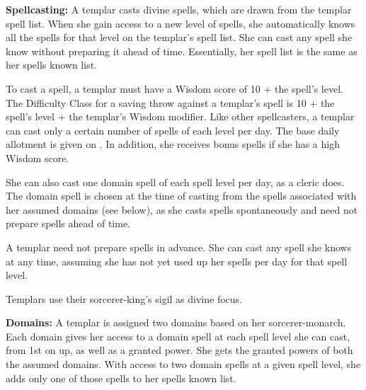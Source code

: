 \textbf{Spellcasting:} A templar casts divine spells, which are drawn from the templar spell list. When she gain access to a new level of spells, she automatically knows all the spells for that level on the templar's spell list. She can cast any spell she know without preparing it ahead of time. Essentially, her spell list is the same as her spells known list.

To cast a spell, a templar must have a Wisdom score of 10 + the spell's level. The Difficulty Class for a saving throw against a templar's spell is 10 + the spell's level + the templar's Wisdom modifier. Like other spellcasters, a templar can cast only a certain number of spells of each level per day. The base daily allotment is given on . In addition, she receives bonus spells if she has a high Wisdom score.

She can also cast one domain spell of each spell level per day, as a cleric does. The domain spell is chosen at the time of casting from the spells associated with her assumed domains (see below), as she casts spells spontaneously and need not prepare spells ahead of time.

A templar need not prepare spells in advance. She can cast any spell she knows at any time, assuming she has not yet used up her spells per day for that spell level.

Templars use their sorcerer-king's sigil as divine focus.


\textbf{Domains:} A templar is assigned two domains based on her sorcerer-monarch. Each domain gives her access to a domain spell at each spell level she can cast, from 1st on up, as well as a granted power. She gets the granted powers of both the assumed domains. With access to two domain spells at a given spell level, she adds only one of those spells to her spells known list.



